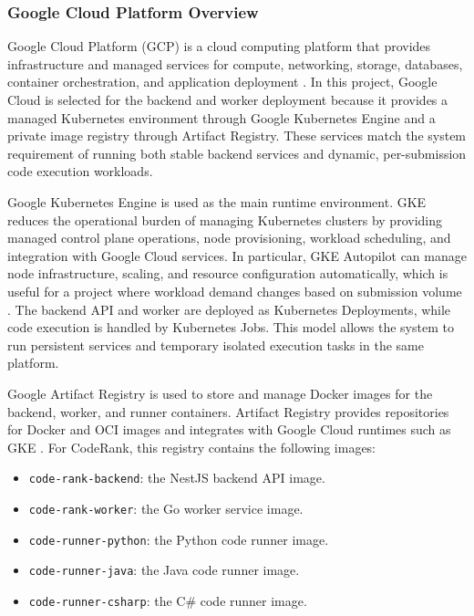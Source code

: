 \subsubsection{Google Cloud Platform Overview}

Google Cloud Platform (GCP) is a cloud computing platform that provides infrastructure and managed services for compute, networking, storage, databases, container orchestration, and application deployment \cite{google_cloud2026}. In this project, Google Cloud is selected for the backend and worker deployment because it provides a managed Kubernetes environment through Google Kubernetes Engine and a private image registry through Artifact Registry. These services match the system requirement of running both stable backend services and dynamic, per-submission code execution workloads.

Google Kubernetes Engine is used as the main runtime environment. GKE reduces the operational burden of managing Kubernetes clusters by providing managed control plane operations, node provisioning, workload scheduling, and integration with Google Cloud services. In particular, GKE Autopilot can manage node infrastructure, scaling, and resource configuration automatically, which is useful for a project where workload demand changes based on submission volume \cite{gke2026}. The backend API and worker are deployed as Kubernetes Deployments, while code execution is handled by Kubernetes Jobs. This model allows the system to run persistent services and temporary isolated execution tasks in the same platform.

Google Artifact Registry is used to store and manage Docker images for the backend, worker, and runner containers. Artifact Registry provides repositories for Docker and OCI images and integrates with Google Cloud runtimes such as GKE \cite{artifact_registry2026}. For CodeRank, this registry contains the following images:

\begin{itemize}
    \item \texttt{code-rank-backend}: the NestJS backend API image.
    \item \texttt{code-rank-worker}: the Go worker service image.
    \item \texttt{code-runner-python}: the Python code runner image.
    \item \texttt{code-runner-java}: the Java code runner image.
    \item \texttt{code-runner-csharp}: the C\# code runner image.
\end{itemize}

